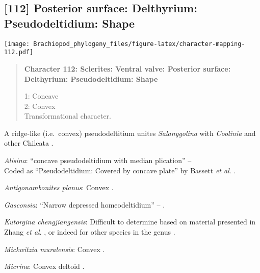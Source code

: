 \documentclass[openany]{book}
\theoremstyle{definition}
\theoremstyle{definition}
\theoremstyle{definition}
\theoremstyle{remark}
\begin{document}
\subsection*{{[}112{]} Posterior surface: Delthyrium: Pseudodeltidium:
Shape}\label{posterior-surface-delthyrium-pseudodeltidium-shape}

\texttt{[image: Brachiopod\_phylogeny\_files/figure-latex/character-mapping-112.pdf]}

\begin{quote}
\textbf{Character 112: Sclerites: Ventral valve: Posterior surface:
Delthyrium: Pseudodeltidium: Shape}

1: Concave\\
2: Convex\\
Transformational character.
\end{quote}

A ridge-like (i.e.~convex) pseudodeltitium unites \emph{Salanygolina}
with \emph{Coolinia} and other Chileata
\citep[p.~6]{Holmer2009Theenigmatic}.

\hypertarget{Alisina-coding-112}{}
\emph{Alisina}: ``concave pseudodeltidium with median plication'' --
\citet{Williams2000LinguliformeaCraniiformea}\\
Coded as ``Pseudodeltidium: Covered by concave plate'' by Bassett
\emph{et al}. \citeyearpar{Bassett2001Functionalmorphology}.

\hypertarget{Antigonambonites_planus-coding-112}{}
\emph{Antigonambonites planus}: Convex \citep[fig.
508]{Williams2000LinguliformeaCraniiformea}.

\hypertarget{Gasconsia-coding-112}{}
\emph{Gasconsia}: ``Narrow depressed homeodeltidium'' --
\citet{Hanken1985Thetaxonomy}.

\hypertarget{Kutorgina_chengjiangensis-coding-112}{}
\emph{Kutorgina chengjiangensis}: Difficult to determine based on
material presented in Zhang \emph{et al}.
\citeyearpar{Zhang2007Rhynchonelliformeanbrachiopods}, or indeed for
other species in the genus
\citep[e.g.][]{Williams2000LinguliformeaCraniiformea, Skovsted2005EarlyCambrian, Holmer2018Theattachment}.

\hypertarget{Mickwitzia_muralensis-coding-112}{}
\emph{Mickwitzia muralensis}: Convex \citep[see][fig.
4B]{Balthasar2004Shellstructure}.

\hypertarget{Micrina-coding-112}{}
\emph{Micrina}: Convex deltoid \citep{Holmer2008TheEarly}.
\end{document}
